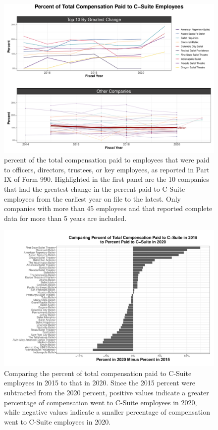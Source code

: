 \documentclass[Dance Data
Project,article,submit,moreauthors,pdftex]{mdpi}
\begin{document}
\begin{figure}[H]
\includegraphics[width=0.9\linewidth,]{../images/frac-comp} \caption{\label{fig:frac-comp} percent of the total compensation paid to employees that were paid to officers, directors, trustees, or key employees, as reported in Part IX of Form 990. Highlighted in the first panel are the 10 companies that had the greatest change in the percent paid to C-Suite employees from the earliest year on file to the latest. Only companies with more than 45 employees and that reported complete data for more than 5 years are included.}\label{fig:unnamed-chunk-17}
\end{figure}

\begin{figure}[H]
\includegraphics[width=0.9\linewidth,]{../images/csuite-comp-bar} \caption{\label{fig:csuite-comp-bar} Comparing the percent of total compensation paid to C-Suite employees in 2015 to that in 2020. Since the 2015 percent were subtracted from the 2020 percent, positive values indicate a greater percentage of compensation went to C-Suite employees in 2020, while negative values indicate a smaller percentage of compensation went to C-Suite employees in 2020.}\label{fig:unnamed-chunk-18}
\end{figure}
\end{document}
